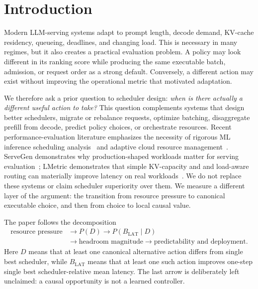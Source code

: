 \documentclass[preprint,12pt]{elsarticle}
\begin{document}
\section{Introduction}
\label{sec:introduction}

Modern LLM-serving systems adapt to prompt length, decode demand, KV-cache
residency, queueing, deadlines, and changing load. This is necessary in many
regimes, but it also creates a practical evaluation problem. A policy may
look different in its ranking score while producing the same executable
batch, admission, or request order as a strong default. Conversely, a
different action may exist without improving the operational metric that
motivated adaptation.

We therefore ask a prior question to scheduler design: \emph{when is there
actually a different useful action to take?} This question complements
systems that design better schedulers, migrate or rebalance requests,
optimize batching, disaggregate prefill from decode, predict policy choices,
or orchestrate resources. Recent performance-evaluation literature emphasizes the necessity of rigorous ML inference scheduling analysis~\cite{choudhury2025job} and adaptive cloud resource management~\cite{ali2025enabling}. ServeGen demonstrates why production-shaped
workloads matter for serving evaluation~\cite{servegen2025}; LMetric
demonstrates that simple KV-capacity and and load-aware routing can materially
improve latency on real workloads~\cite{lmetric2026}. We do not replace these
systems or claim scheduler superiority over them. We measure a different
layer of the argument: the transition from resource pressure to canonical
executable choice, and then from choice to local causal value.

The paper follows the decomposition
\begin{equation}
  \begin{aligned}
  \text{resource pressure}&\longrightarrow P(D)\longrightarrow
  P(B_{\mathrm{LAT}}\mid D)\\
  &\longrightarrow\text{headroom magnitude}
  \longrightarrow\text{predictability and deployment}.
  \end{aligned}
  \label{eq:chain}
\end{equation}
Here $D$ means that at least one canonical alternative action differs from
single best scheduler, while $B_{\mathrm{LAT}}$ means that at least one such action improves
one-step single best scheduler-relative mean latency. The last arrow is deliberately left
unclaimed: a causal opportunity is not a learned controller.
\end{document}
